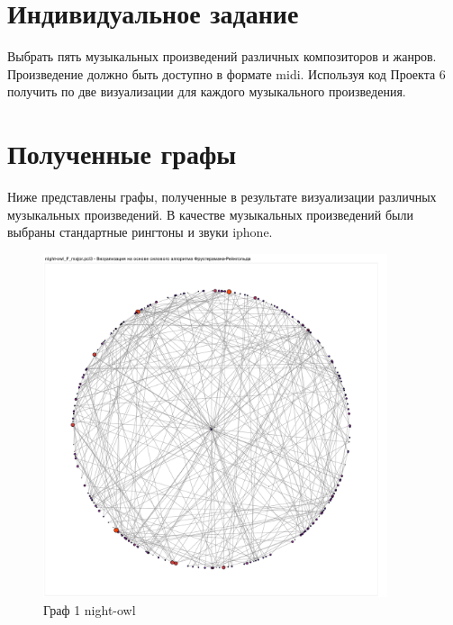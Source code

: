 \tableofcontents
\clearpage

\section{Индивидуальное задание}

Выбрать пять музыкальных произведений различных композиторов и жанров. Произведение должно быть доступно в формате midi. Используя код Проекта 6 получить по две визуализации для каждого музыкального произведения.

\section{Полученные графы}

Ниже представлены графы, полученные в результате визуализации различных музыкальных произведений. В качестве музыкальных произведений были выбраны стандартные рингтоны и звуки iphone.

\begin{figure}[H]
	\caption{Граф 1 night-owl}
	\includegraphics[width=0.9\textwidth]{img/night-owl1.pdf}
\end{figure}

